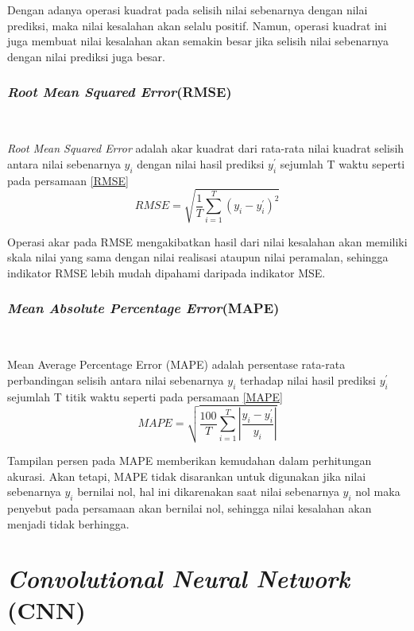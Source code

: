\documentclass[../thesis.tex]{subfiles}
\begin{document}
Dengan adanya operasi kuadrat pada selisih nilai sebenarnya dengan nilai prediksi, maka nilai kesalahan akan selalu positif. Namun, operasi kuadrat ini juga membuat nilai kesalahan 
akan semakin besar jika selisih nilai sebenarnya dengan nilai prediksi juga besar.


\subsubsection{\textit{Root Mean Squared Error}(RMSE)} \hfill\

\textit{Root Mean Squared Error} adalah akar kuadrat dari rata-rata nilai kuadrat selisih antara nilai sebenarnya $y_i$ dengan nilai hasil prediksi $y^{'}_i$ sejumlah T waktu seperti pada persamaan \ref{RMSE}
\begin{equation}\label{RMSE}
	RMSE = \sqrt{\frac {1}{T}\sum \limits_{i=1}^{T} {(y_i - y^{'}_i)^2}}
\end{equation}

Operasi akar pada RMSE mengakibatkan hasil dari nilai kesalahan akan memiliki skala nilai yang sama dengan nilai realisasi ataupun nilai peramalan, sehingga
indikator RMSE lebih mudah dipahami daripada indikator MSE. 

\subsubsection{\textit{Mean Absolute Percentage Error}(MAPE)} \hfill\

Mean Average Percentage Error (MAPE) adalah persentase rata-rata perbandingan selisih antara nilai sebenarnya $y_i$ terhadap nilai hasil prediksi $y^{'}_i$ sejumlah T
titik waktu seperti pada persamaan \ref{MAPE}
\begin{equation}\label{MAPE}
	MAPE = \sqrt{\frac {100}{T}\sum \limits_{i=1}^{T} {\left|{\frac {y_i - y^{'}_i}{y_i}}\right|}}
\end{equation}

Tampilan persen pada MAPE memberikan kemudahan dalam perhitungan akurasi. Akan tetapi, MAPE tidak disarankan untuk digunakan jika nilai sebenarnya $y_i$
bernilai nol, hal ini dikarenakan saat nilai sebenarnya $y_i$ nol maka penyebut pada persamaan akan bernilai nol, sehingga nilai kesalahan akan menjadi tidak berhingga.

\section{\textit{Convolutional Neural Network} (CNN)}
\end{document}
